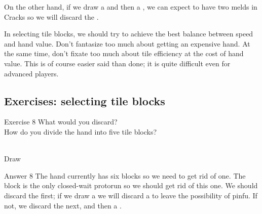\bigskip
On the other hand, if we draw a {\large{}} and then a {\large{}}, we can expect to have two melds in Cracks so we will discard the {\large{}}.
\emj
\vspace{-10pt}

In selecting tile blocks, we should try to achieve the best balance between speed and hand value. Don't fantasize too much about getting an expensive hand. At the same time, don't fixate too much about tile efficiency at the cost of hand value. This is of course easier said than done; it is quite difficult even for advanced players. 

\vfill

\subsection*{Exercises: selecting tile blocks}

\bigskip

\begin{itembox}[l]{Exercise 8}
What would you discard? \\
\vsp
How do you divide the hand into five tile blocks? 

\bp
{}~\\
\hspace{290pt}\footnotesize{Draw}
\ep
\end{itembox}

\newpage

\begin{itembox}[r]{Answer 8}
\emj
The hand currently has six blocks so we need to get rid of one. The {\large{}} block is the only closed-wait protorun so we should get rid of this one. We should discard the {\large{}} first; if we draw a {\large{}} we will discard a {\large{}} to leave the possibility of {\jap pinfu}. If not, we discard the {\large{}} next, and then a {\large{}}. 
\end{itembox}

